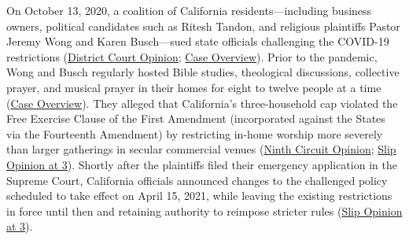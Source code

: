 \documentclass[12pt]{article}
\begin{document}
On October 13, 2020, a coalition of California residents---including business owners, political candidates such as Ritesh Tandon, and religious plaintiffs Pastor Jeremy Wong and Karen Busch---sued state officials challenging the COVID-19 restrictions (\href{https://caselaw.findlaw.com/court/us-dis-crt-n-d-cal-san-jos-div/2110794.html}{District Court Opinion}; \href{https://en.wikipedia.org/wiki/Tandon_v._Newsom}{Case Overview}). Prior to the pandemic, Wong and Busch regularly hosted Bible studies, theological discussions, collective prayer, and musical prayer in their homes for eight to twelve people at a time (\href{https://en.wikipedia.org/wiki/Tandon_v._Newsom}{Case Overview}). They alleged that California's three-household cap violated the Free Exercise Clause of the First Amendment (incorporated against the States via the Fourteenth Amendment) by restricting in-home worship more severely than larger gatherings in secular commercial venues (\href{https://law.justia.com/cases/federal/appellate-courts/ca9/21-15228/21-15228-2021-03-30.html}{Ninth Circuit Opinion}; \href{https://www.supremecourt.gov/opinions/20pdf/20a151_4g15.pdf}{Slip Opinion at 3}). Shortly after the plaintiffs filed their emergency application in the Supreme Court, California officials announced changes to the challenged policy scheduled to take effect on April 15, 2021, while leaving the existing restrictions in force until then and retaining authority to reimpose stricter rules (\href{https://www.supremecourt.gov/opinions/20pdf/20a151_4g15.pdf}{Slip Opinion at 3}).
\end{document}
